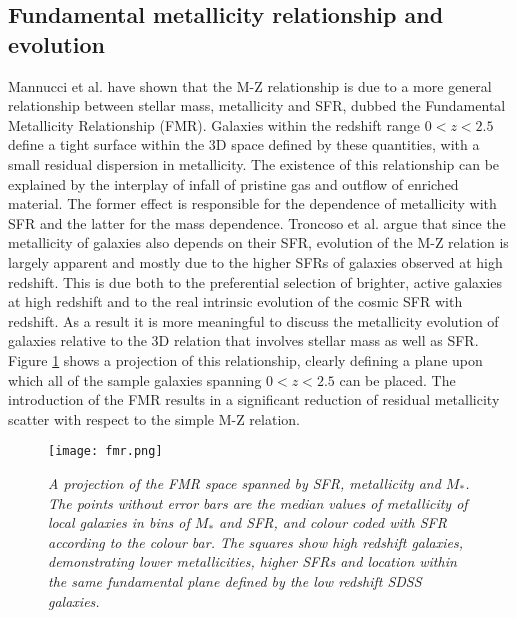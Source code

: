 \documentclass{literature}
\begin{document}
\subsection{Fundamental metallicity relationship and evolution}\label{subsec:fmr}
Mannucci et al. \citep{Mannucci2010} have shown that the M-Z relationship is due to a more general relationship between stellar mass, metallicity and SFR, dubbed the Fundamental Metallicity Relationship (FMR). Galaxies within the redshift range $0 < z < 2.5$ define a tight surface within the 3D space defined by these quantities, with a small residual dispersion in metallicity. The existence of this relationship can be explained by the interplay of infall of pristine gas and outflow of enriched material. The former effect is responsible for the dependence of metallicity with SFR and the latter for the mass dependence. Troncoso et al. \citep{Troncoso_2014} argue that since the metallicity of galaxies also depends on their SFR, evolution of the M-Z relation is largely apparent and mostly due to the higher SFRs of galaxies observed at high redshift. This is due both to the preferential selection of brighter, active galaxies at high redshift and to the real intrinsic evolution of the cosmic SFR with redshift. As a result it is more meaningful to discuss the metallicity evolution of galaxies relative to the 3D relation that involves stellar mass as well as SFR. Figure \ref{fig:fmr_new} shows a projection of this relationship, clearly defining a plane upon which all of the sample galaxies spanning $0 < z < 2.5$ can be placed. The introduction of the FMR results in a significant reduction of residual metallicity scatter with respect to the simple M-Z relation. \\ 

\begin{figure}[!htp]
\centering
\texttt{[image: fmr.png]}
\caption{\footnotesize{\emph{A projection of the FMR space spanned by SFR, metallicity and $M_{*}$. The points without error bars are the median values of metallicity of local galaxies in bins of $M_{*}$ and SFR, and colour coded with SFR according to the colour bar. The squares show high redshift galaxies, demonstrating lower metallicities, higher SFRs and location within the same fundamental plane defined by the low redshift SDSS galaxies.}}}
\label{fig:fmr_new}
\end{figure} 
\end{document}
